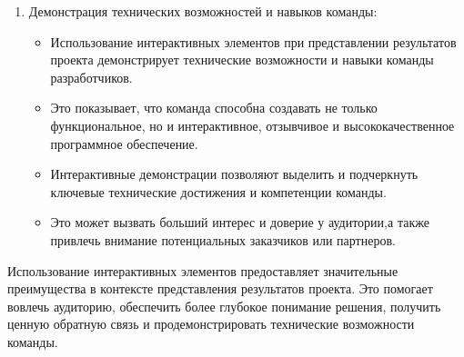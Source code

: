 \begin{enumerate}
\begin{itemize}
            \item Интерактивное взаимодействие помогает выявить ключевые проблемы, недостатки или области для улучшения.
        \end{itemize}
        \item Демонстрация технических возможностей и навыков команды:
        \begin{itemize}
            \item Использование интерактивных элементов при представлении результатов проекта демонстрирует технические возможности и навыки команды разработчиков.
            \item Это показывает, что команда способна создавать не только функциональное, но и интерактивное, отзывчивое и высококачественное программное обеспечение.
            \item Интерактивные демонстрации позволяют выделить и подчеркнуть ключевые технические достижения и компетенции команды.
            \item Это может вызвать больший интерес и доверие у аудитории,а также привлечь внимание потенциальных заказчиков или партнеров.
        \end{itemize}
\end{enumerate}

Использование интерактивных элементов предоставляет значительные преимущества в контексте представления результатов проекта. Это помогает вовлечь аудиторию, обеспечить более глубокое понимание решения, получить ценную обратную связь и продемонстрировать технические возможности команды.

